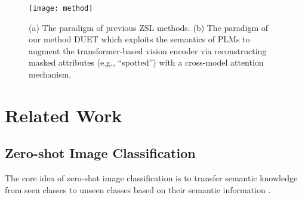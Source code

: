 \documentclass[letterpaper]{article} \usepackage{aaai23}  \usepackage{times}  \usepackage{helvet}  \usepackage{courier}  \usepackage[hyphens]{url}  \usepackage{graphicx} \urlstyle{rm} \def\UrlFont{\rm}  \usepackage{natbib}  \usepackage{caption} \frenchspacing  \setlength{\pdfpagewidth}{8.5in}  \setlength{\pdfpageheight}{11in}  \usepackage{algorithm}
\newcommand{\wen}[1]{{\color{black}#1}}
\begin{document}
\begin{figure}[htbp]
  \centering
  \vspace{-2pt}
  \texttt{[image: method]}
  \vspace{-2pt}
  \caption{ (a) {The paradigm of previous ZSL methods.} 
(b) {The paradigm of our method DUET 
which exploits the semantics of PLMs to augment the transformer-based vision encoder via reconstructing masked attributes (e.g., ``spotted'') with a cross-model attention mechanism.}}
  \label{fig:compare}
  \vspace{-12pt}
\end{figure}
\section{Related Work}
\subsection{Zero-shot Image Classification}
\wen{The core idea of zero-shot image classification}
is to transfer semantic knowledge from seen classes to unseen classes based on their semantic information 
\cite{DBLP:conf/ijcai/ChenG0HPC21,DBLP:journals/corr/abs-2112-10006}.
\end{document}
